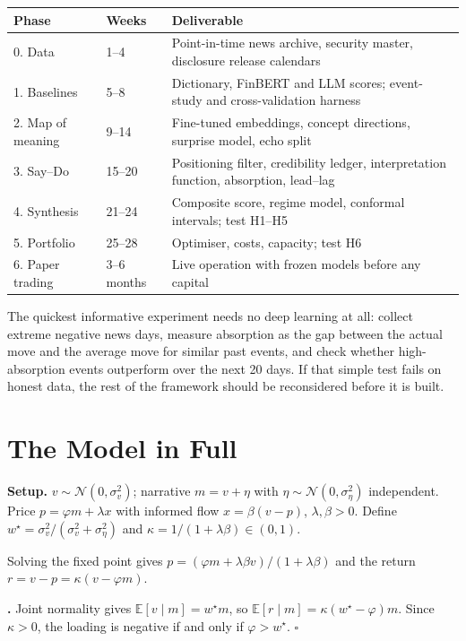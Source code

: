 \documentclass[11pt,a4paper]{article}
\theoremstyle{plain}
\theoremstyle{definition}
\newcommand{\E}{\mathbb{E}}
\newcommand{\N}{\mathcal{N}}
\begin{document}
\begin{center}
\small
\begin{tabularx}{\textwidth}{@{}llX@{}}
\toprule
Phase & Weeks & Deliverable \\
\midrule
0. Data & 1--4 & Point-in-time news archive, security master, disclosure release calendars \\
1. Baselines & 5--8 & Dictionary, FinBERT and LLM scores; event-study and cross-validation harness \\
2. Map of meaning & 9--14 & Fine-tuned embeddings, concept directions, surprise model, echo split \\
3. Say--Do & 15--20 & Positioning filter, credibility ledger, interpretation function, absorption, lead--lag \\
4. Synthesis & 21--24 & Composite score, regime model, conformal intervals; test H1--H5 \\
5. Portfolio & 25--28 & Optimiser, costs, capacity; test H6 \\
6. Paper trading & 3--6 months & Live operation with frozen models before any capital \\
\bottomrule
\end{tabularx}
\end{center}

The quickest informative experiment needs no deep learning at all: collect extreme negative news days, measure absorption as the gap between the actual move and the average move for similar past events, and check whether high-absorption events outperform over the next 20 days. If that simple test fails on honest data, the rest of the framework should be reconsidered before it is built.

\appendix
\section{The Model in Full}\label{app:model}

\textbf{Setup.} $v\sim\N(0,\sigma_v^2)$; narrative $m=v+\eta$ with $\eta\sim\N(0,\sigma_\eta^2)$ independent. Price $p=\varphi m+\lambda x$ with informed flow $x=\beta(v-p)$, $\lambda,\beta>0$. Define $w^\star=\sigma_v^2/(\sigma_v^2+\sigma_\eta^2)$ and $\kappa=1/(1+\lambda\beta)\in(0,1)$.

Solving the fixed point gives $p=(\varphi m+\lambda\beta v)/(1+\lambda\beta)$ and the return $r=v-p=\kappa(v-\varphi m)$.

\textbf{.} Joint normality gives $\E[v\mid m]=w^\star m$, so $\E[r\mid m]=\kappa(w^\star-\varphi)m$. Since $\kappa>0$, the loading is negative if and only if $\varphi>w^\star$. \hfill$\square$
\end{document}
